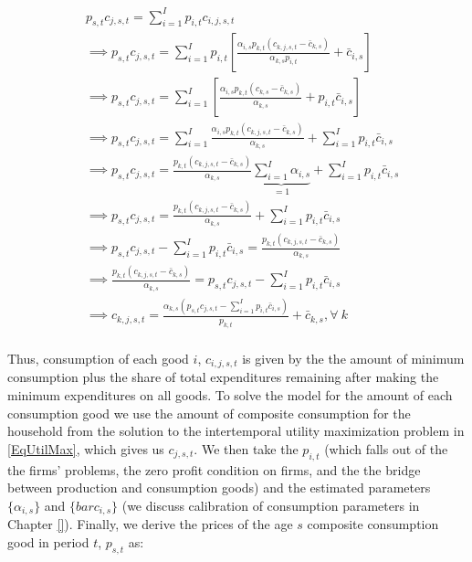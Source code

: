           \begin{equation} \label{eqn:cons_solve}
      \begin{split}
       & p_{s,t}c_{j,s,t} = \sum_{i=1}^{I}p_{i,t}c_{i,j,s,t} \\
       & \implies  p_{s,t}c_{j,s,t} = \sum_{i=1}^{I}p_{i,t}\left[ \frac{\alpha_{i,s} p_{k,t}(c_{k,j,s,t}-\bar{c}_{k,s})}{\alpha_{k,s} p_{i,t}} + \bar{c}_{i,s}\right] \\
       & \implies  p_{s,t}c_{j,s,t} = \sum_{i=1}^{I}\left[ \frac{\alpha_{i,s} p_{k,t}(c_{k,s}-\bar{c}_{k,s})}{\alpha_{k,s}} + p_{i,t}\bar{c}_{i,s}\right] \\
       & \implies  p_{s,t}c_{j,s,t} = \sum_{i=1}^{I} \frac{\alpha_{i,s} p_{k,t}(c_{k,j,s,t}-\bar{c}_{k,s})}{\alpha_{k,s}} + \sum_{i=1}^{I} p_{i,t}\bar{c}_{i,s}\\	
       & \implies  p_{s,t}c_{j,s,t} = \frac{ p_{k,t}(c_{k,j,s,t}-\bar{c}_{k,s})}{\alpha_{k,s}} \underbrace{\sum_{i=1}^{I}\alpha_{i,s}}_{=1}  + \sum_{i=1}^{I} p_{i,t}\bar{c}_{i,s}\\	
        & \implies  p_{s,t}c_{j,s,t} = \frac{ p_{k,t}(c_{k,j,s,t}-\bar{c}_{k,s})}{\alpha_{k,s}} + \sum_{i=1}^{I} p_{i,t}\bar{c}_{i,s}\\
        & \implies  p_{s,t}c_{j,s,t} - \sum_{i=1}^{I} p_{i,t}\bar{c}_{i,s} = \frac{ p_{k,t}(c_{k,j,s,t}-\bar{c}_{k,s})}{\alpha_{k,s}}  \\	
        & \implies  \frac{ p_{k,t}(c_{k,j,s,t}-\bar{c}_{k,s})}{\alpha_{k,s}}  = p_{s,t}c_{j,s,t} - \sum_{i=1}^{I} p_{i,t}\bar{c}_{i,s}   \\	
        & \implies  c_{k,j,s,t}  = \frac{\alpha_{k,s} \left(p_{s,t}c_{j,s,t} - \sum_{i=1}^{I} p_{i,t}\bar{c}_{i,s}\right)}{p_{k,t}} + \bar{c}_{k,s},  \forall \ k  \\	
       \end{split}
    \end{equation}
    
    Thus, consumption of each good $i$, $c_{i,j,s,t}$ is given by the the amount of minimum consumption plus the share of total expenditures remaining after making the minimum expenditures on all goods.  To solve the model for the amount of each consumption good we use the amount of composite consumption for the household from the solution to the intertemporal utility maximization problem in \ref{EqUtilMax}, which gives us $c_{j,s,t}$. We then take the $p_{i,t}$ (which falls out of the the firms' problems, the zero profit condition on firms, and the the bridge between production and consumption goods) and the estimated parameters $\{\alpha_{i,s}\}$ and $\{bar{c}_{i,s}\}$ (we discuss calibration of consumption parameters in Chapter \ref{}).  Finally, we derive the prices of the age $s$ composite consumption good in period $t$, $p_{s,t}$ as: 
    
